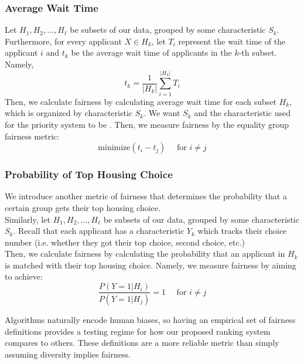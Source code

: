 \documentclass[11pt]{article}
\begin{document}
\subsubsection{Average Wait Time}
Let $H_1, H_2, \dots, H_\ell$ be subsets of our data, grouped by some characteristic $S_k$. Furthermore, for every applicant $X \in H_k$, let $T_i$ represent the wait time of the applicant $i$ and $t_k$ be the average wait time of applicants in the $k$-th subset. Namely,
\[t_k = \frac{1}{|H_k|}\sum_{i=1}^{|H_k|}T_i\]
Then, we calculate fairness by calculating average wait time for each subset $H_k$, which is organized by characteristic $S_k$. We want $S_k$ and the characteristic used for the priority system to be . Then, we measure fairness by the equality group fairness metric:
\[\text{minimize}(t_i - t_j) \quad \text{ for } i \neq j\]
\subsubsection{Probability of Top Housing Choice}
We introduce another metric of fairness that determines the probability that a certain group gets their top housing choice. \\
\newline
Similarly, let $H_1, H_2, \dots, H_\ell$ be subsets of our data, grouped by some characteristic $S_k$. Recall that each applicant has a characteristic $Y_k$ which tracks their choice number (i.e. whether they got their top choice, second choice, etc.) \\
\newline
Then, we calculate fairness by calculating the probability that an applicant in $H_k$ is matched with their top housing choice. Namely, we measure fairness by aiming to achieve:
\[\frac{P(Y = 1 | H_i)}{P(Y = 1 | H_j)} = 1 \quad \text{ for } i \neq j\]

Algorithms naturally encode human biases, so having an empirical set of fairness definitions provides a testing regime for how our proposed ranking system compares to others. These definitions are a more reliable metric than simply assuming diversity implies fairness. 
\end{document}
